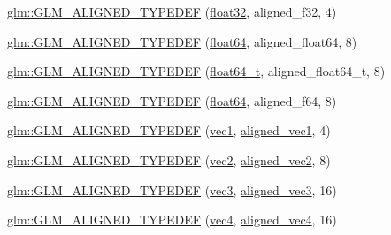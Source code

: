 \begin{DoxyCompactItemize}
\item 
\mbox{\hyperlink{group__gtx__type__aligned_gadbce23b9f23d77bb3884e289a574ebd5}{glm\+::\+G\+L\+M\+\_\+\+A\+L\+I\+G\+N\+E\+D\+\_\+\+T\+Y\+P\+E\+D\+EF}} (\mbox{\hyperlink{group__gtc__type__precision_ga814f2f65354b6588b067cc5c67a6b340}{float32}}, aligned\+\_\+f32, 4)
\item 
\mbox{\hyperlink{group__gtx__type__aligned_ga75930684ff2233171c573e603f216162}{glm\+::\+G\+L\+M\+\_\+\+A\+L\+I\+G\+N\+E\+D\+\_\+\+T\+Y\+P\+E\+D\+EF}} (\mbox{\hyperlink{group__gtc__type__precision_gab721f828b41f46b20cf4883b50733d3b}{float64}}, aligned\+\_\+float64, 8)
\item 
\mbox{\hyperlink{group__gtx__type__aligned_ga6e3a2d83b131336219a0f4c7cbba2a48}{glm\+::\+G\+L\+M\+\_\+\+A\+L\+I\+G\+N\+E\+D\+\_\+\+T\+Y\+P\+E\+D\+EF}} (\mbox{\hyperlink{group__gtc__type__precision_gade966a3eb25ebeb16dd53c40d3fdeb46}{float64\+\_\+t}}, aligned\+\_\+float64\+\_\+t, 8)
\item 
\mbox{\hyperlink{group__gtx__type__aligned_gaa4deaa0dea930c393d55e7a4352b0a20}{glm\+::\+G\+L\+M\+\_\+\+A\+L\+I\+G\+N\+E\+D\+\_\+\+T\+Y\+P\+E\+D\+EF}} (\mbox{\hyperlink{group__gtc__type__precision_gab721f828b41f46b20cf4883b50733d3b}{float64}}, aligned\+\_\+f64, 8)
\item 
\mbox{\hyperlink{group__gtx__type__aligned_ga81bc497b2bfc6f80bab690c6ee28f0f9}{glm\+::\+G\+L\+M\+\_\+\+A\+L\+I\+G\+N\+E\+D\+\_\+\+T\+Y\+P\+E\+D\+EF}} (\mbox{\hyperlink{group__ext__vec1_ga16030dae9029ed1eab1553a2183bbb79}{vec1}}, \mbox{\hyperlink{group__gtc__type__aligned_ga8cf75c112dfa39264b7ef65c2ed6b3c4}{aligned\+\_\+vec1}}, 4)
\item 
\mbox{\hyperlink{group__gtx__type__aligned_gada3e8f783e9d4b90006695a16c39d4d4}{glm\+::\+G\+L\+M\+\_\+\+A\+L\+I\+G\+N\+E\+D\+\_\+\+T\+Y\+P\+E\+D\+EF}} (\mbox{\hyperlink{group__core__types_gaa1618f51db67eaa145db101d8c8431d8}{vec2}}, \mbox{\hyperlink{group__gtc__type__aligned_ga8f4a38f220c72d218dbdc7bc1d06a1a2}{aligned\+\_\+vec2}}, 8)
\item 
\mbox{\hyperlink{group__gtx__type__aligned_gab8d081fac3a38d6f55fa552f32168d32}{glm\+::\+G\+L\+M\+\_\+\+A\+L\+I\+G\+N\+E\+D\+\_\+\+T\+Y\+P\+E\+D\+EF}} (\mbox{\hyperlink{group__core__types_ga1c47e8b3386109bc992b6c48e91b0be7}{vec3}}, \mbox{\hyperlink{group__gtc__type__aligned_ga9c54536a3becfd10a44f6b1b8c4aa3d3}{aligned\+\_\+vec3}}, 16)
\item 
\mbox{\hyperlink{group__gtx__type__aligned_ga12fe7b9769c964c5b48dcfd8b7f40198}{glm\+::\+G\+L\+M\+\_\+\+A\+L\+I\+G\+N\+E\+D\+\_\+\+T\+Y\+P\+E\+D\+EF}} (\mbox{\hyperlink{group__core__types_ga5881b1b022d7fd1b7218f5916532dd02}{vec4}}, \mbox{\hyperlink{group__gtc__type__aligned_gad26d520694d7b865507819c2d9f2b196}{aligned\+\_\+vec4}}, 16)

\end{DoxyCompactItemize}
